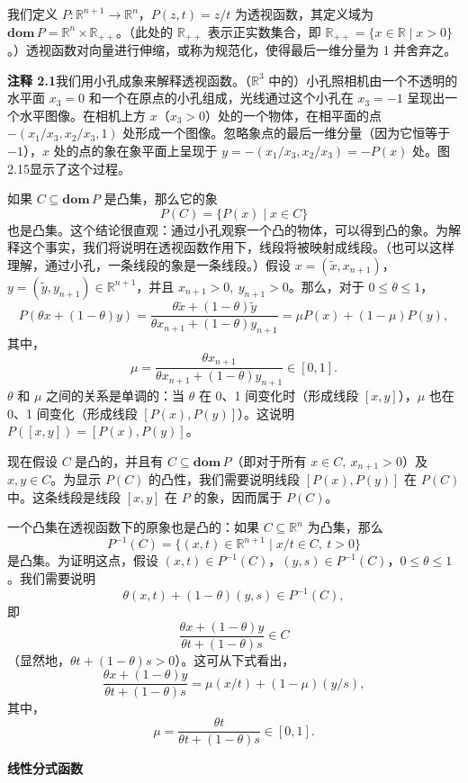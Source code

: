 \documentclass[UTF8, 12pt, fontset=fandol, oneside]{ctexart}
\begin{document}
我们定义 $P:\mathbb{R}^{n+1}\to\mathbb{R}^n$，$P(z,t)=z/t$ 为透视函数，其定义域为 $\mathbf{dom}\,P=\mathbb{R}^n\times\mathbb{R}_{++}$。（此处的 $\mathbb{R}_{++}$ 表示正实数集合，即 $\mathbb{R}_{++}=\{x\in\mathbb{R}\mid x>0\}$。）透视函数对向量进行伸缩，或称为规范化，使得最后一维分量为 1 并舍弃之。

\noindent\textbf{注释 2.1}\quad 我们用小孔成象来解释透视函数。（$\mathbb{R}^3$ 中的）小孔照相机由一个不透明的水平面 $x_3=0$ 和一个在原点的小孔组成，光线通过这个小孔在 $x_3=-1$ 呈现出一个水平图像。在相机上方 $x$（$x_3>0$）处的一个物体，在相平面的点 $-(x_1/x_3,x_2/x_3,1)$ 处形成一个图像。忽略象点的最后一维分量（因为它恒等于 $-1$），$x$ 处的点的象在象平面上呈现于 $y=-(x_1/x_3,x_2/x_3)=-P(x)$ 处。图2.15显示了这个过程。

如果 $C\subseteq\mathbf{dom}\,P$ 是凸集，那么它的象
\[
  P(C)=\{P(x)\mid x\in C\}
\]
也是凸集。这个结论很直观：通过小孔观察一个凸的物体，可以得到凸的象。为解释这个事实，我们将说明在透视函数作用下，线段将被映射成线段。（也可以这样理解，通过小孔，一条线段的象是一条线段。）假设 $x=(\tilde{x},x_{n+1})$，$y=(\tilde{y},y_{n+1})\in\mathbb{R}^{n+1}$，并且 $x_{n+1}>0,\ y_{n+1}>0$。那么，对于 $0\le\theta\le 1$，
\[
  P(\theta x+(1-\theta)y)
  =
  \frac{\theta\tilde{x}+(1-\theta)\tilde{y}}{\theta x_{n+1}+(1-\theta)y_{n+1}}
  =\mu P(x)+(1-\mu)P(y),
\]
其中，
\[
  \mu=\frac{\theta x_{n+1}}{\theta x_{n+1}+(1-\theta)y_{n+1}}\in[0,1].
\]
$\theta$ 和 $\mu$ 之间的关系是单调的：当 $\theta$ 在 0、1 间变化时（形成线段 $[x,y]$），$\mu$ 也在 0、1 间变化（形成线段 $[P(x),P(y)]$）。这说明 $P([x,y])=[P(x),P(y)]$。

现在假设 $C$ 是凸的，并且有 $C\subseteq\mathbf{dom}\,P$（即对于所有 $x\in C,\ x_{n+1}>0$）及 $x,y\in C$。为显示 $P(C)$ 的凸性，我们需要说明线段 $[P(x),P(y)]$ 在 $P(C)$ 中。这条线段是线段 $[x,y]$ 在 $P$ 的象，因而属于 $P(C)$。

一个凸集在透视函数下的原象也是凸的：如果 $C\subseteq\mathbb{R}^n$ 为凸集，那么
\[
  P^{-1}(C)=\{(x,t)\in\mathbb{R}^{n+1}\mid x/t\in C,\ t>0\}
\]
是凸集。为证明这点，假设 $(x,t)\in P^{-1}(C)$，$(y,s)\in P^{-1}(C)$，$0\le\theta\le 1$。我们需要说明
\[
  \theta(x,t)+(1-\theta)(y,s)\in P^{-1}(C),
\]
即
\[
  \frac{\theta x+(1-\theta)y}{\theta t+(1-\theta)s}\in C
\]
（显然地，$\theta t+(1-\theta)s>0$）。这可从下式看出，
\[
  \frac{\theta x+(1-\theta)y}{\theta t+(1-\theta)s}
  =\mu(x/t)+(1-\mu)(y/s),
\]
其中，
\[
  \mu=\frac{\theta t}{\theta t+(1-\theta)s}\in[0,1].
\]

\noindent\textbf{线性分式函数}
\end{document}
